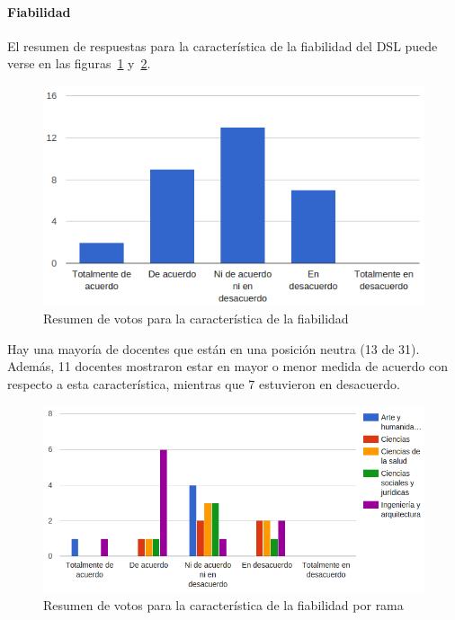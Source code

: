 \newpage
\paragraph*{Fiabilidad}

El resumen de respuestas para la característica de la fiabilidad del DSL puede verse en las figuras~\ref{fig:evalmetodo:dsl:fiabilidad} y~\ref{fig:evalmetodo:dsl:fiabilidad:rama}.

\begin{figure}[h]
  \begin{center}
    \includegraphics[scale=0.5]{C_DSL_fiabilidad.png}
  \end{center}
  \caption{Resumen de votos para la característica de la fiabilidad}
  \label{fig:evalmetodo:dsl:fiabilidad}
\end{figure}

Hay una mayoría de docentes que están en una posición neutra (13 de 31). Además, 11 docentes mostraron estar en mayor o menor medida de acuerdo con respecto a esta característica, mientras que 7 estuvieron en desacuerdo. 

\begin{figure}[h]
  \begin{center}
    \includegraphics[scale=0.5]{C_DSL_fiabilidad_rama.png}
  \end{center}
  \caption{Resumen de votos para la característica de la fiabilidad por rama}
  \label{fig:evalmetodo:dsl:fiabilidad:rama}
\end{figure}
    

